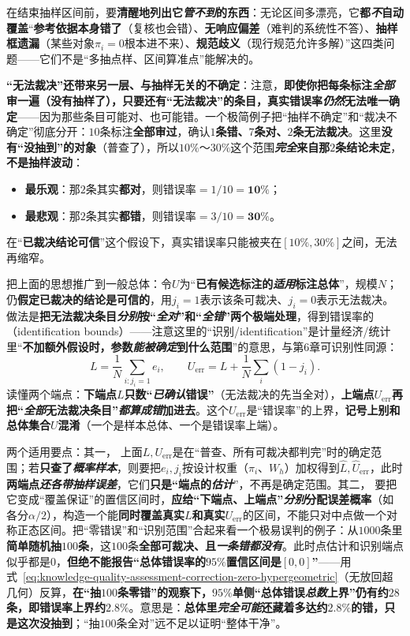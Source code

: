 在结束抽样区间前，要\textbf{清醒地列出它\emph{管不到}的东西}：无论区间多漂亮，它\textbf{都\emph{不}自动覆盖}“\textbf{参考依据本身错了}（复核也会错）、\textbf{无响应偏差}（难判的系统性不答）、\textbf{抽样框遗漏}（某些对象$\pi_i=0$根本进不来）、\textbf{规范歧义}（现行规范允许多解）”这四类问题——它们不是“多抽点样、区间算准点”能解决的。

\textbf{“无法裁决”还带来另一层、与抽样无关的不确定}：注意，\textbf{即使你把每条标注\emph{全部}审一遍（没有抽样了），只要还有“无法裁决”的条目，真实错误率\emph{仍然}无法唯一确定}——因为那些条目可能对、也可能错。一个极简例子把“抽样不确定”和“裁决不确定”彻底分开：$10$条标注\textbf{全部审过}，确认\textbf{$1$条错、$7$条对、$2$条无法裁决}。这里\textbf{没有“没抽到”的对象}（普查了），所以$10\%$～$30\%$这个范围\textbf{\emph{完全}来自那$2$条结论未定}，\textbf{不是抽样波动}：
\begin{itemize}\item \textbf{最乐观}：那$2$条其实\textbf{都对}，则错误率$=1/10=\mathbf{10\%}$；\item \textbf{最悲观}：那$2$条其实\textbf{都错}，则错误率$=3/10=\mathbf{30\%}$。\end{itemize}
在“\textbf{已裁决结论可信}”这个假设下，真实错误率只能被夹在$[10\%,30\%]$之间，无法再缩窄。

把上面的思想推广到一般总体：令$U$为“\textbf{已有候选标注的\emph{适用}标注总体}”，规模$N$；仍\textbf{假定已裁决的结论是可信的}，用$j_i=1$表示该条可裁决、$j_i=0$表示无法裁决。做法是\textbf{把无法裁决条目\emph{分别}按“\emph{全对}”和“\emph{全错}”两个极端处理}，得到错误率的（identification bounds）——注意这里的“识别/identification”是计量经济/统计里“\textbf{不加额外假设时，参数\emph{能被确定}到什么范围}”的意思，与第6章可识别性同源：
\[
  L=\frac{1}{N}\sum_{i:j_i=1}e_i,
  \qquad
  U_{\mathrm{err}}=L+\frac{1}{N}\sum_i(1-j_i).
\]
读懂两个端点：\textbf{下端点$L$只数“\emph{已确认}错误”}（无法裁决的先当全对），\textbf{上端点$U_{\mathrm{err}}$再把“\emph{全部}无法裁决条目”\emph{都算成错}加进去}。这个$U_{\mathrm{err}}$是“错误率”的上界，\textbf{记号上别和总体集合$U$混淆}（一个是样本总体、一个是错误率上端）。

两个适用要点：其一， 上面$L,U_{\mathrm{err}}$是在“普查、所有可裁决都判完”时的确定范围；若\textbf{只查了\emph{概率样本}}，则要把$e_i,j_i$按设计权重（$\pi_i$、$W_h$）加权得到$\widehat L,\widehat U_{\mathrm{err}}$，此时\textbf{两端点\emph{还各带抽样误差}}，它们\textbf{只是“端点的\emph{估计}}”，不再是确定范围。其二， 要把它变成“覆盖保证”的置信区间时，\textbf{应给“下端点、上端点”\emph{分别}分配误差概率}（如各分$\alpha/2$），构造一个能\textbf{同时覆盖真实$L$和真实$U_{\mathrm{err}}$}的区间，不能只对中点做一个对称正态区间。把“零错误”和“识别范围”合起来看一个极易误判的例子：从$1000$条里\textbf{简单随机抽$100$条}，这$100$条\textbf{全部可裁决、且\emph{一条错都没有}}。此时点估计和识别端点似乎都是$0$，\textbf{但绝不能报告“总体错误率的$95\%$置信区间是$[0,0]$”}——用式~\eqref{eq:knowledge-quality-assessment-correction-zero-hypergeometric}（无放回超几何）反算，\textbf{在“抽$100$条零错”的观察下，$95\%$单侧“总体错误\emph{总数}上界”仍有约$28$条，即错误率上界约$2.8\%$}。意思是：\textbf{总体里\emph{完全可能}还藏着多达约$2.8\%$的错，只是这次没抽到}；“抽$100$条全对”远不足以证明“整体干净”。

